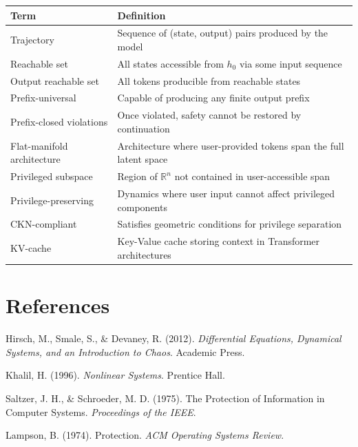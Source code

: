 \documentclass[11pt]{article}
\theoremstyle{definition}
\theoremstyle{remark}
\begin{document}
\vspace{0.5em}
\begin{center}
\begin{tabular}{>{\raggedright}p{4cm} >{\raggedright\arraybackslash}p{10cm}}
\toprule
\textbf{Term} & \textbf{Definition} \\
\midrule
Trajectory & Sequence of (state, output) pairs produced by the model \\[0.3em]
Reachable set & All states accessible from $h_0$ via some input sequence \\[0.3em]
Output reachable set & All tokens producible from reachable states \\[0.3em]
Prefix-universal & Capable of producing any finite output prefix \\[0.3em]
Prefix-closed violations & Once violated, safety cannot be restored by continuation \\[0.3em]
Flat-manifold architecture & Architecture where user-provided tokens span the full latent space \\[0.3em]
Privileged subspace & Region of $\mathbb{R}^n$ not contained in user-accessible span \\[0.3em]
Privilege-preserving & Dynamics where user input cannot affect privileged components \\[0.3em]
CKN-compliant & Satisfies geometric conditions for privilege separation \\[0.3em]
KV-cache & Key-Value cache storing context in Transformer architectures \\
\bottomrule
\end{tabular}
\end{center}

\section*{References}

\begin{enumerate}[label={[\arabic*]}]
    \item Hirsch, M., Smale, S., \& Devaney, R. (2012). \emph{Differential Equations, Dynamical Systems, and an Introduction to Chaos}. Academic Press.
    \item Khalil, H. (1996). \emph{Nonlinear Systems}. Prentice Hall.
    \item Saltzer, J. H., \& Schroeder, M. D. (1975). The Protection of Information in Computer Systems. \emph{Proceedings of the IEEE}.
    \item Lampson, B. (1974). Protection. \emph{ACM Operating Systems Review}.
\end{enumerate}
\end{document}
